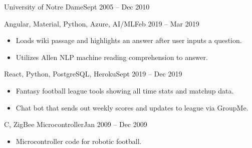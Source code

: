  {University of Notre Dame}{Sept 2005 -- Dec 2010 \hspace{1 cm}}{}

\smallskip
{}

\smallskip
{}
{Angular, Material, Python, Azure, AI/ML}{Feb 2019 -- Mar 2019}{}
\begin{itemize}
\item Loads wiki passage and highlights an answer after user inputs a question.
\item Utilizes Allen NLP machine reading comprehension to answer.
\end{itemize}

\divider

{React, Python, PostgreSQL, Heroku}{Sept 2019 -- Dec 2019}{}
\begin{itemize}
\item  Fantasy football league tools showing all time stats and matchup data.
\item  Chat bot that sends out weekly scores and updates to league via GroupMe.
\end{itemize}

\divider

{C, ZigBee Microcontroller}{Jan 2009 -- Dec 2009}{}
\begin{itemize}
\item  Microcontroller code for robotic football.
\end{itemize}

